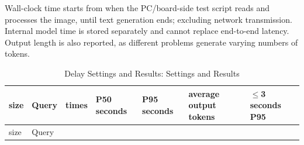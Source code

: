 Wall-clock time starts from when the PC/board-side test script reads and processes the image, until text generation ends; excluding network transmission. Internal model time is stored separately and cannot replace end-to-end latency. Output length is also reported, as different problems generate varying numbers of tokens.

\FloatBarrier\begingroup\small\setlength{\tabcolsep}{2.5pt}
\begin{longtable}[]{@{}
  >{\raggedleft\arraybackslash}p{}
  >{\raggedright\arraybackslash}p{}
  >{\raggedleft\arraybackslash}p{}
  >{\raggedleft\arraybackslash}p{}
  >{\raggedleft\arraybackslash}p{}
  >{\raggedleft\arraybackslash}p{}
  >{\raggedright\arraybackslash}p{}@{}}
\caption{Delay Settings and Results: Settings and Results}\label{tab:s24-1}\tabularnewline
\toprule\noalign{}
\begin{minipage}[b]{\linewidth}\raggedleft
size
\end{minipage} & \begin{minipage}[b]{\linewidth}\raggedright
Query
\end{minipage} & \begin{minipage}[b]{\linewidth}\raggedleft
times
\end{minipage} & \begin{minipage}[b]{\linewidth}\raggedleft
P50 seconds
\end{minipage} & \begin{minipage}[b]{\linewidth}\raggedleft
P95 seconds
\end{minipage} & \begin{minipage}[b]{\linewidth}\raggedleft
average output tokens
\end{minipage} & \begin{minipage}[b]{\linewidth}\raggedright
\(\leq\)3 seconds P95
\end{minipage} \\
\midrule\noalign{}
\endfirsthead
\toprule\noalign{}
\begin{minipage}[b]{\linewidth}\raggedleft
size
\end{minipage} & \begin{minipage}[b]{\linewidth}\raggedright
Query
\end{minipage} & \begin{minipage}[b]{\linewidth}\raggedleft

\end{minipage}
\end{longtable}
